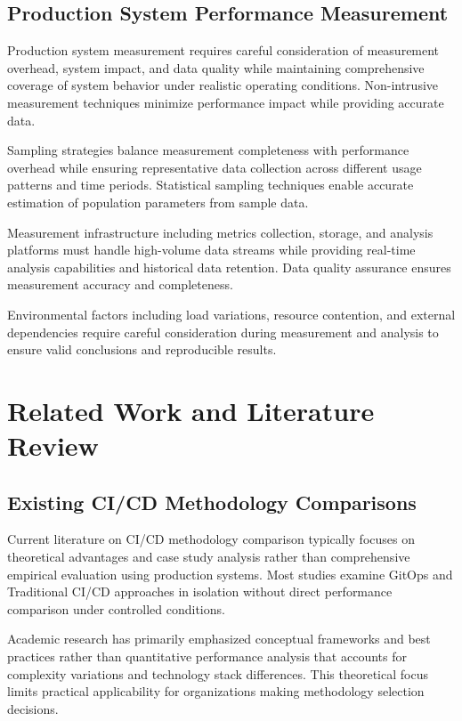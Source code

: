 \subsection{Production System Performance Measurement}

Production system measurement requires careful consideration of measurement overhead, system impact, and data quality while maintaining comprehensive coverage of system behavior under realistic operating conditions. Non-intrusive measurement techniques minimize performance impact while providing accurate data.

Sampling strategies balance measurement completeness with performance overhead while ensuring representative data collection across different usage patterns and time periods. Statistical sampling techniques enable accurate estimation of population parameters from sample data.

Measurement infrastructure including metrics collection, storage, and analysis platforms must handle high-volume data streams while providing real-time analysis capabilities and historical data retention. Data quality assurance ensures measurement accuracy and completeness.

Environmental factors including load variations, resource contention, and external dependencies require careful consideration during measurement and analysis to ensure valid conclusions and reproducible results.

\section{Related Work and Literature Review}

\subsection{Existing CI/CD Methodology Comparisons}

Current literature on CI/CD methodology comparison typically focuses on theoretical advantages and case study analysis rather than comprehensive empirical evaluation using production systems. Most studies examine GitOps and Traditional CI/CD approaches in isolation without direct performance comparison under controlled conditions.

Academic research has primarily emphasized conceptual frameworks and best practices rather than quantitative performance analysis that accounts for complexity variations and technology stack differences. This theoretical focus limits practical applicability for organizations making methodology selection decisions.

